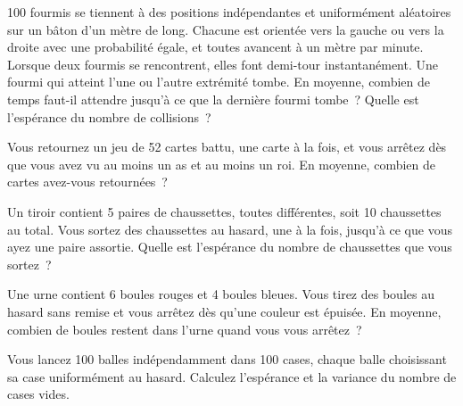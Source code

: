 \begin{question}\label{iq:iv1:expectation-and-indicators:16}
100 fourmis se tiennent à des positions indépendantes et uniformément aléatoires sur un bâton d'un mètre de long. Chacune est orientée vers la gauche ou vers la droite avec
une probabilité égale, et toutes avancent à un mètre par minute. Lorsque deux fourmis se rencontrent, elles font demi-tour instantanément. Une fourmi
qui atteint l'une ou l'autre extrémité tombe. En moyenne, combien de temps faut-il attendre jusqu'à ce que la dernière fourmi tombe~? Quelle est l'espérance du nombre
de collisions~?
\end{question}

\begin{question}\label{iq:iv1:expectation-and-indicators:17}
Vous retournez un jeu de 52 cartes battu, une carte à la fois, et vous arrêtez dès que vous avez vu au moins un as et au
moins un roi. En moyenne, combien de cartes avez-vous retournées~?
\end{question}

\begin{question}\label{iq:iv1:expectation-and-indicators:18}
Un tiroir contient 5 paires de chaussettes, toutes différentes, soit 10 chaussettes au total. Vous sortez des chaussettes au hasard, une à la
fois, jusqu'à ce que vous ayez une paire assortie. Quelle est l'espérance du nombre de chaussettes que vous sortez~?
\end{question}

\begin{question}\label{iq:iv1:expectation-and-indicators:19}
Une urne contient 6 boules rouges et 4 boules bleues. Vous tirez des boules au hasard sans remise et vous arrêtez dès qu'une couleur
est épuisée. En moyenne, combien de boules restent dans l'urne quand vous vous arrêtez~?
\end{question}

\begin{question}\label{iq:iv1:expectation-and-indicators:20}
Vous lancez 100 balles indépendamment dans 100 cases, chaque balle choisissant sa case uniformément au hasard. Calculez l'espérance et la variance du nombre de cases vides.
\end{question}

